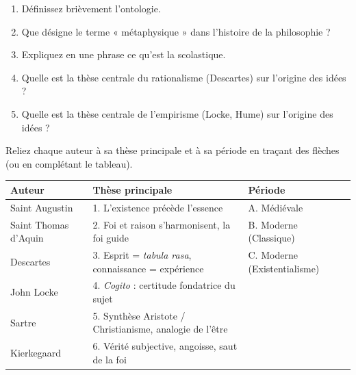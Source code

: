 \documentclass[11pt]{article}
\begin{document}
\begin{exercice}
\begin{enumerate}
    \item Définissez brièvement l'ontologie.
    \item Que désigne le terme « métaphysique » dans l'histoire de la philosophie ?
    \item Expliquez en une phrase ce qu'est la scolastique.
    \item Quelle est la thèse centrale du rationalisme (Descartes) sur l'origine des idées ?
    \item Quelle est la thèse centrale de l'empirisme (Locke, Hume) sur l'origine des idées ?
\end{enumerate}
\end{exercice}

\begin{exercice}
Reliez chaque auteur à sa thèse principale et à sa période en traçant des flèches (ou en complétant le tableau).

\begin{tabular}{|l|l|l|}
\hline
\textbf{Auteur} & \textbf{Thèse principale} & \textbf{Période} \\
\hline
Saint Augustin & 1. L'existence précède l'essence & A. Médiévale \\
\hline
Saint Thomas d'Aquin & 2. Foi et raison s'harmonisent, la foi guide & B. Moderne (Classique) \\
\hline
Descartes & 3. Esprit = \textit{tabula rasa}, connaissance = expérience & C. Moderne (Existentialisme) \\
\hline
John Locke & 4. \textit{Cogito} : certitude fondatrice du sujet & \\
\hline
Sartre & 5. Synthèse Aristote / Christianisme, analogie de l'être & \\
\hline
Kierkegaard & 6. Vérité subjective, angoisse, saut de la foi & \\
\hline
\end{tabular}
\end{exercice}
\end{document}
